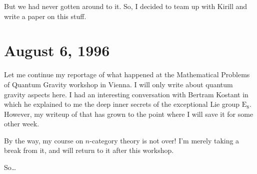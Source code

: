 \documentclass{article}
\renewcommand{\texttt}[1]{%
  \begingroup
  \ttfamily
  \begingroup\lccode`~=`/\lowercase{\endgroup\def~}{/\discretionary{}{}{}}%
  \begingroup\lccode`~=`[\lowercase{\endgroup\def~}{[\discretionary{}{}{}}%
  \begingroup\lccode`~=`.\lowercase{\endgroup\def~}{.\discretionary{}{}{}}%
  \catcode`/=\active\catcode`[=\active\catcode`.=\active
  \scantokens{#1\noexpand}%
  \endgroup
}
\begin{document}
\begin{itemize}

  But we had never gotten around to it. So, I decided to team up with
  Kirill and write a paper on this stuff.
\end{itemize}
\hypertarget{week86}{%
\section{August 6, 1996}\label{week86}}

Let me continue my reportage of what happened at the Mathematical
Problems of Quantum Gravity workshop in Vienna. I will only write about
quantum gravity aspects here. I had an interesting conversation with
Bertram Kostant in which he explained to me the deep inner secrets of
the exceptional Lie group \(\mathrm{E}_8\). However, my writeup of that
has grown to the point where I will save it for some other week.

By the way, my course on \(n\)-category theory is not over! I'm merely
taking a break from it, and will return to it after this workshop.

So\ldots{}
\end{document}
